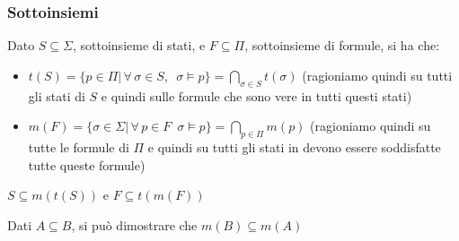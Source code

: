 				      				\subsubsection{Sottoinsiemi}
				      			\begin{definizione}
				      			    	Dato $S\subseteq \Sigma$, sottoinsieme di stati, e $F\subseteq\Pi$, sottoinsieme di formule, si
				      				ha che:
				      				\begin{itemize}
				      					\item $t(S)=\{p\in \Pi|\,\forall\,\sigma\in S,\,\,\,\sigma\vDash
				      					      p\}=\bigcap_{\sigma\in S}t(\sigma)$ (ragioniamo quindi su tutti gli stati di $S$
				      					      e quindi sulle formule che sono vere in tutti questi stati) 
				      					\item $m(F)=\{\sigma\in \Sigma|\,\forall\, p\in F\,\,\,\sigma\vDash
				      					      p\}=\bigcap_{p\in \Pi}m(p)$ (ragioniamo quindi su tutte le formule di $\Pi$
				      					      e quindi su tutti gli stati in devono essere soddisfatte tutte queste formule) 
				      				\end{itemize}
				      				\begin{corollario}
				      				            $S\subseteq m(t(S))$ e $F\subseteq
				      				t(m(F))$
				      				\end{corollario}
				      				\begin{corollario}
				      				             Dati $A\subseteq B$, si può dimostrare che $m(B)\subseteq
				      				m(A)$
				      				\end{corollario}
				      			\end{definizione}
